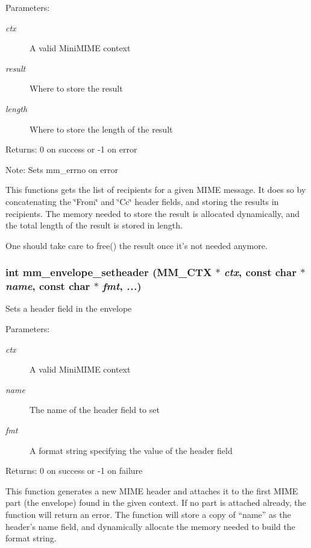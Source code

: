 \begin{Desc}
\item[Parameters:]
\begin{description}
\item[{\em ctx}]A valid Mini\-MIME context \item[{\em result}]Where to store the result \item[{\em length}]Where to store the length of the result \end{description}
\end{Desc}
\begin{Desc}
\item[Returns:]0 on success or -1 on error \end{Desc}
\begin{Desc}
\item[Note:]Sets mm\_\-errno on error\end{Desc}
This functions gets the list of recipients for a given MIME message. It does so by concatenating the \char`\"{}From\char`\"{} and \char`\"{}Cc\char`\"{} header fields, and storing the results in recipients. The memory needed to store the result is allocated dynamically, and the total length of the result is stored in length.

One should take care to free() the result once it's not needed anymore. 
\subsubsection{\setlength{\rightskip}{0pt plus 5cm}int mm\_\-envelope\_\-setheader (MM\_\-CTX $\ast$ {\em ctx}, const char $\ast$ {\em name}, const char $\ast$ {\em fmt},  {\em ...})}\label{group__envelope_gb2c43c1645e42ae0860c902ce1dda788}


Sets a header field in the envelope

\begin{Desc}
\item[Parameters:]
\begin{description}
\item[{\em ctx}]A valid Mini\-MIME context \item[{\em name}]The name of the header field to set \item[{\em fmt}]A format string specifying the value of the header field \end{description}
\end{Desc}
\begin{Desc}
\item[Returns:]0 on success or -1 on failure\end{Desc}
This function generates a new MIME header and attaches it to the first MIME part (the envelope) found in the given context. If no part is attached already, the function will return an error. The function will store a copy of ``name'' as the header's name field, and dynamically allocate the memory needed to build the format string. 